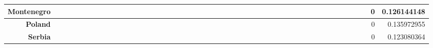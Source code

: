 \documentclass[a4paper,11pt]{report}
\begin{document}
\begin{appendices}
\begin{landscape}
\begin{longtable}{r|r|r|r|r|r|r|r|r|r|r|r|r|r|r|r|r|r|r|r|r|r|r|r|r|r|r|r|r|r|r|r|r|r|r|r|r|r|r|r|r|r|r|r|r|r|r|}
\multicolumn{1}{|r|}{\textbf{Montenegro}}            &                  &                  &                  &                     &                  &                  &                                &                   &                  &                 &                         &                  &                  &                           &                  &                 &                  &                 &                  &                  &                  &                 &                 &                    &                &                  &                     &                 &                 &                   &                  &                 &                 &                   &                   &                &                 &                      &                          &                 &                  &                         &                 &                & 0                        & 0.126144148        \\ \hline
\multicolumn{1}{|r|}{\textbf{Poland}}                &                  &                  &                  &                     &                  &                  &                                &                   &                  &                 &                         &                  &                  &                           &                  &                 &                  &                 &                  &                  &                  &                 &                 &                    &                &                  &                     &                 &                 &                   &                  &                 &                 &                   &                   &                &                 &                      &                          &                 &                  &                         &                 &                & 0                        & 0.135972955        \\ \hline
\multicolumn{1}{|r|}{\textbf{Serbia}}                &                  &                  &                  &                     &                  &                  &                                &                   &                  &                 &                         &                  &                  &                           &                  &                 &                  &                 &                  &                  &                  &                 &                 &                    &                &                  &                     &                 &                 &                   &                  &                 &                 &                   &                   &                &                 &                      &                          &                 &                  &                         &                 &                & 0                        & 0.123080364        \\ \hline

\end{longtable}
\end{landscape}
\end{appendices}
\end{document}
